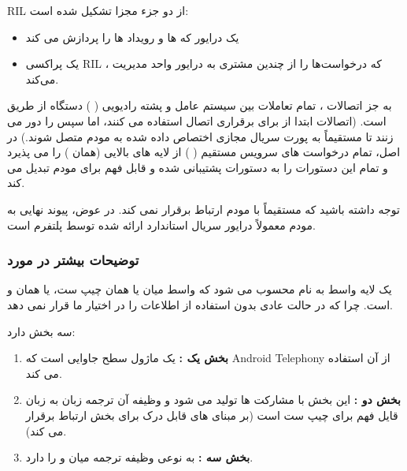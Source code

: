 \documentclass{report}
\begin{document}
            RIL
             از دو جزء مجزا تشکیل شده است: 
             \begin{itemize}
             	\item  یک درایور 
             	 که 
             	 ها و رویداد ها را پردازش می کند
             	\item یک پراکسی 
             	RIL
             	، که درخواست‌ها را از چندین مشتری به درایور 
             	 واحد مدیریت می‌کند. 
             \end{itemize}
             به جز اتصالات 
             ، تمام تعاملات بین سیستم عامل 
             و 
             پشته رادیویی (
             )
              دستگاه از طریق 
               است. (اتصالات
                 ابتدا از
                   برای برقراری اتصال استفاده می کنند، اما سپس 
                    را دور می زنند تا مستقیماً به پورت سریال مجازی اختصاص داده شده به مودم متصل شوند.) در اصل،
                      تمام درخواست های سرویس مستقیم (
                      ) از لایه های بالایی (همان 
                      ) را می پذیرد و تمام این دستورات را به دستورات پشتیبانی شده و قابل فهم برای مودم تبدیل می کند.
            
            توجه داشته باشید که
              مستقیماً با مودم ارتباط برقرار نمی کند. در عوض، پیوند نهایی به مودم معمولاً درایور سریال استاندارد ارائه شده توسط پلتفرم
                است.
                
   \subsubsection*{توضیحات بیشتر در مورد 
   }
    یک لایه واسط به نام 
     محسوب می شود 
     که واسط میان
       یا همان چیپ ست، 
       یا همان
        و
          ‌است.  
   چرا که 
   در حالت عادی بدون استفاده از
    اطلاعات را در اختیار ما قرار نمی دهد.
    
     سه بخش دارد:
     \begin{enumerate}
     	\item
 \textbf{بخش یک
 :
 }
   یک ماژول سطح جاوایی است که
    Android Telephony
     از آن استفاده می کند.
     \item
\textbf{بخش دو
:
}
این بخش با مشارکت 
   ها تولید می شود و وظیفه آن ترجمه زبان
    به زبان قایل فهم برای چیپ ست است (بر مبنای
      های قابل درک برای بخش
        ارتباط برقرار می کند).
\item \textbf{بخش سه
:
}
  به نوعی وظیفه ترجمه میان
    و
      را دارد.
     \end{enumerate}
  
\end{document}
